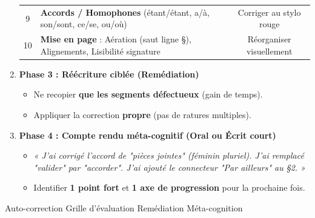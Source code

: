\documentclass[11pt]{article}
\newcommand{\cle}[1]{{\popxbold\color{popdark}#1}}
\begin{document}
\begin{methode}
\begin{enumerate}
\begin{center}
\begin{tabular}{|c|l|c|}
        9 & \textbf{Accords / Homophones} (étant/étant, a/à, son/sont, ce/se, ou/où) & Corriger au stylo rouge \\
        10 & \textbf{Mise en page} : Aération (saut ligne §), Alignements, Lisibilité signature & Réorganiser visuellement \\
        \hline
    \end{tabular}
    \end{center}
    \item \textbf{Phase 3 : Réécriture ciblée (Remédiation)}
    \begin{itemize}
        \item Ne recopier \textbf{que les segments défectueux} (gain de temps).
        \item Appliquer la correction \textbf{propre} (pas de ratures multiples).
    \end{itemize}
    \item \textbf{Phase 4 : Compte rendu méta-cognitif (Oral ou Écrit court)}
    \begin{itemize}
        \item \emph{« J'ai corrigé l'accord de "pièces jointes" (féminin pluriel). J'ai remplacé "valider" par "accorder". J'ai ajouté le connecteur "Par ailleurs" au §2. »}
        \item Identifier \textbf{1 point fort} et \textbf{1 axe de progression} pour la prochaine fois.
    \end{itemize}
\end{enumerate}
\cle{Auto-correction} \cle{Grille d'évaluation} \cle{Remédiation} \cle{Méta-cognition}
\end{methode}
\end{document}
